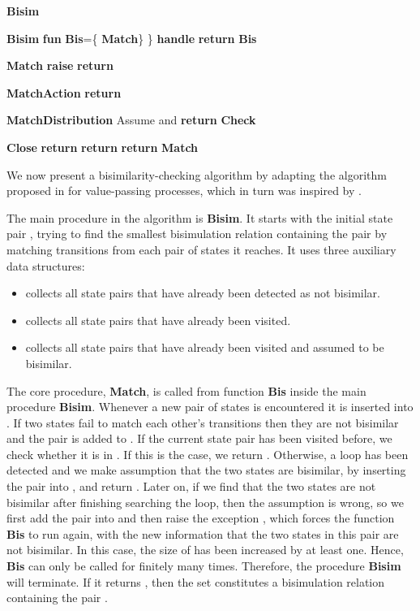\documentclass{article}
\begin{document}
\begin{algorithm}
\caption{\textbf{Bisim}}
\parbox[c]{7.8cm}{
\begin{algorithmic}
\STATE \textbf{Bisim} \STATE  \STATE
\textbf{fun} \textbf{Bis}=\{ \STATE \qquad 
\STATE \qquad  \STATE \qquad
\textbf{Match}\} \STATE\} \textbf{handle}
 \STATE \textbf{return}
\textbf{Bis}

\bigskip
\STATE \textbf{Match} \STATE
 \STATE  \IF{} \STATE  \IF{} \STATE
\textbf{raise}  \ENDIF \ENDIF \STATE
\textbf{return} 

\bigskip
\STATE \textbf{MatchAction} \FORALL{}
\FORALL{} \STATE
 \ENDFOR
\ENDFOR \STATE \textbf{return} 

\bigskip
\STATE\textbf{MatchDistribution} \STATE Assume
 and
 \STATE
 \STATE
\textbf{return} \textbf{Check}

\bigskip
\STATE\textbf{Close} \IF{} \STATE
\textbf{return}  \ELSIF{} \STATE
 \STATE \textbf{return} 
\ELSE \STATE \textbf{return} \textbf{Match} \ENDIF
\end{algorithmic}
}
\end{algorithm}

We now present a bisimilarity-checking algorithm by adapting the
algorithm proposed in \cite{Lin98} for value-passing processes,
which in turn was inspired by \cite{FM90}.

The main procedure in the algorithm is \textbf{Bisim}. It
starts with the initial state pair , trying to find the
smallest bisimulation relation containing the pair by matching
transitions from each pair of states it reaches.  It uses three
auxiliary data structures:
\begin{itemize}
\item  collects all state pairs that have already been
  detected as not bisimilar.
\item  collects all state pairs that have already been
  visited.
\item  collects all state pairs that have already been
  visited and assumed to be bisimilar.
\end{itemize}
The core procedure, \textbf{Match}, is called from function
\textbf{Bis} inside the main procedure \textbf{Bisim}. Whenever a
new pair of states is encountered it is inserted into . If
two states fail to match each other's transitions then they are not
bisimilar and the pair is added to . If the current state
pair has been visited before, we check whether it is in .
If this is the case, we return . Otherwise, a loop has been
detected and we make assumption that the two states are bisimilar,
by inserting the pair into , and return . Later on,
if we find that the two states are not bisimilar after finishing
searching the loop, then the assumption is wrong, so we first add
the pair into  and then raise the exception
, which forces the function \textbf{Bis} to run
again, with the new information that the two states in this pair are
not bisimilar. In this case, the size of  has been
increased by at least one. Hence, \textbf{Bis} can only be called
for finitely many times. Therefore, the procedure
\textbf{Bisim} will terminate. If it returns , then the
set  constitutes a bisimulation relation
containing the pair .
\end{document}
